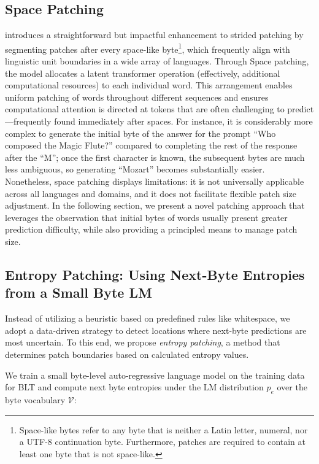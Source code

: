 \subsection{Space Patching}
\label{section:white-patch}

\citet{slagle2024spacebyte} introduces a straightforward but impactful enhancement to strided patching by segmenting patches after every space-like byte\footnote{
    Space-like bytes refer to any byte that is neither a Latin letter, numeral, nor a UTF-8 continuation byte. Furthermore, patches are required to contain at least one byte that is not space-like. }, which frequently align with linguistic unit boundaries in a wide array of languages. Through Space patching, the model allocates a latent transformer operation (effectively, additional computational resources) to each individual word. This arrangement enables uniform patching of words throughout different sequences and ensures computational attention is directed at tokens that are often challenging to predict—frequently found immediately after spaces. For instance, it is considerably more complex to generate the initial byte of the answer for the prompt ``Who composed the Magic Flute?\uline{\hspace{.6em}}'' compared to completing the rest of the response after the ``M''; once the first character is known, the subsequent bytes are much less ambiguous, so generating ``Mozart'' becomes substantially easier. Nonetheless, space patching displays limitations: it is not universally applicable across all languages and domains, and it does not facilitate flexible patch size adjustment. In the following section, we present a novel patching approach that leverages the observation that initial bytes of words usually present greater prediction difficulty, while also providing a principled means to manage patch size.

\subsection{Entropy Patching: Using Next-Byte Entropies from a Small Byte LM}
\label{section:dyn-patch}

Instead of utilizing a heuristic based on predefined rules like whitespace, we adopt a data-driven strategy to detect locations where next-byte predictions are most uncertain. To this end, we propose \textit{entropy patching}, a method that determines patch boundaries based on calculated entropy values.

We train a small byte-level auto-regressive language model on the training data for {\textsc BLT} and compute next byte entropies under the LM distribution $p_{e}$ over the byte vocabulary $\mathcal{V}$:


